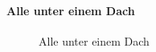 \documentclass[
  letterpaper,
  DIV=11,
  numbers=noendperiod]{scrartcl}
\let\oldparagraph\paragraph
\renewcommand{\paragraph}[1]{\oldparagraph{#1}\mbox{}}
\begin{document}
\paragraph{Alle unter einem Dach}\label{alle-unter-einem-dach}

\begin{figure}


\caption{\label{fig-alle-unter-einem-dach}Alle unter einem Dach}

\end{figure}%
\end{document}
